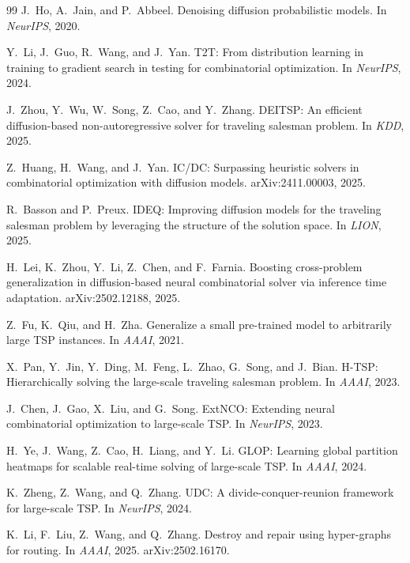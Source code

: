 \documentclass[11pt,a4paper]{ctexart}
\begin{document}
\begin{thebibliography}{99}
J.~Ho, A.~Jain, and P.~Abbeel.
\newblock Denoising diffusion probabilistic models.
\newblock In \emph{NeurIPS}, 2020.

Y.~Li, J.~Guo, R.~Wang, and J.~Yan.
\newblock T2T: From distribution learning in training to gradient search in testing for combinatorial optimization.
\newblock In \emph{NeurIPS}, 2024.

J.~Zhou, Y.~Wu, W.~Song, Z.~Cao, and Y.~Zhang.
\newblock DEITSP: An efficient diffusion-based non-autoregressive solver for traveling salesman problem.
\newblock In \emph{KDD}, 2025.

Z.~Huang, H.~Wang, and J.~Yan.
\newblock IC/DC: Surpassing heuristic solvers in combinatorial optimization with diffusion models.
\newblock arXiv:2411.00003, 2025.

R.~Basson and P.~Preux.
\newblock IDEQ: Improving diffusion models for the traveling salesman problem by leveraging the structure of the solution space.
\newblock In \emph{LION}, 2025.

H.~Lei, K.~Zhou, Y.~Li, Z.~Chen, and F.~Farnia.
\newblock Boosting cross-problem generalization in diffusion-based neural combinatorial solver via inference time adaptation.
\newblock arXiv:2502.12188, 2025.

Z.~Fu, K.~Qiu, and H.~Zha.
\newblock Generalize a small pre-trained model to arbitrarily large TSP instances.
\newblock In \emph{AAAI}, 2021.

X.~Pan, Y.~Jin, Y.~Ding, M.~Feng, L.~Zhao, G.~Song, and J.~Bian.
\newblock H-TSP: Hierarchically solving the large-scale traveling salesman problem.
\newblock In \emph{AAAI}, 2023.

J.~Chen, J.~Gao, X.~Liu, and G.~Song.
\newblock ExtNCO: Extending neural combinatorial optimization to large-scale TSP.
\newblock In \emph{NeurIPS}, 2023.

H.~Ye, J.~Wang, Z.~Cao, H.~Liang, and Y.~Li.
\newblock GLOP: Learning global partition heatmaps for scalable real-time solving of large-scale TSP.
\newblock In \emph{AAAI}, 2024.

K.~Zheng, Z.~Wang, and Q.~Zhang.
\newblock UDC: A divide-conquer-reunion framework for large-scale TSP.
\newblock In \emph{NeurIPS}, 2024.

K.~Li, F.~Liu, Z.~Wang, and Q.~Zhang.
\newblock Destroy and repair using hyper-graphs for routing.
\newblock In \emph{AAAI}, 2025. arXiv:2502.16170.


\end{thebibliography}
\end{document}
